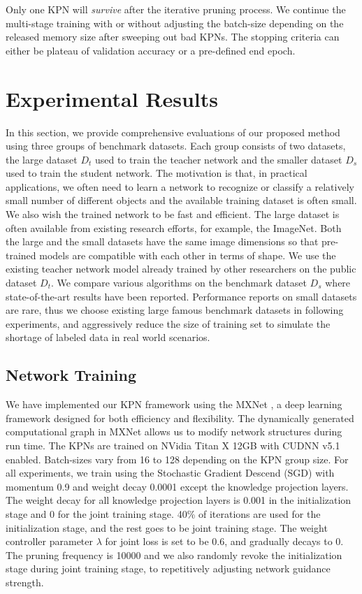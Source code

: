 \documentclass[journal]{IEEEtran}
\begin{document}
Only one KPN will \textit{survive} after the iterative pruning process. We continue the multi-stage training with or without adjusting the batch-size depending on the released memory size after sweeping out bad KPNs. The stopping criteria can either be plateau of validation accuracy or a pre-defined end epoch. 

\section{Experimental Results}
\label{sec:exp}

In this section, we provide comprehensive evaluations of our proposed method using three groups of benchmark datasets. Each group consists of two datasets, the large dataset $D_t$ used to train the teacher network and the smaller dataset $D_s$ used to train the student network. The motivation is that, in practical applications, we often need to learn a network to recognize or classify a relatively small number of different objects and the available training dataset is often small. We also wish the trained network to be fast and efficient. The large dataset is often available from existing research efforts, for example, the ImageNet. Both the large and the small datasets have the same image dimensions so that pre-trained models are compatible with each other in terms of shape. We use the existing teacher network model already trained by other researchers on the public dataset $D_t$. We compare various algorithms on the benchmark dataset $D_s$ where state-of-the-art results have been reported. Performance reports on small datasets are rare, thus we choose existing large famous benchmark datasets in following experiments, and aggressively reduce the size of training set to simulate the shortage of labeled data in real world scenarios.

\subsection{Network Training }
We have implemented our KPN framework using the MXNet \cite{chen2015mxnet}, a deep learning framework designed for both efficiency and flexibility. The dynamically generated computational graph in MXNet allows us to modify network structures during run time. The KPNs are trained on NVidia Titan X 12GB with CUDNN v5.1 enabled. Batch-sizes vary from 16 to 128 depending on the KPN group size. For all experiments, we train using the Stochastic Gradient Descend (SGD) with momentum 0.9 and weight decay 0.0001 except the knowledge projection layers. The weight decay for all knowledge projection layers is 0.001 in the initialization stage and 0 for the joint training stage. 40\% of iterations are used for the initialization stage, and the rest goes to be joint training stage. The weight controller parameter $\lambda$ for joint loss is set to be 0.6, and gradually decays to 0. The pruning frequency is 10000 and we also randomly revoke the initialization stage during joint training stage, to repetitively adjusting network guidance strength. 
\end{document}
